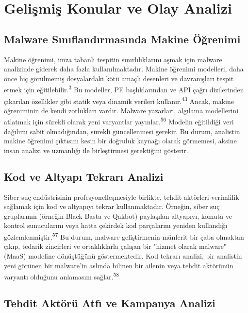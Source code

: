 \section{Gelişmiş Konular ve Olay Analizi}

\subsection{Malware Sınıflandırmasında Makine Öğrenimi}

Makine öğrenimi, imza tabanlı tespitin sınırlılıklarını aşmak için malware analizinde giderek daha fazla kullanılmaktadır. Makine öğrenimi modelleri, daha önce hiç görülmemiş dosyalardaki kötü amaçlı desenleri ve davranışları tespit etmek için eğitilebilir.\textsuperscript{3} Bu modeller, PE başlıklarından ve API çağrı dizilerinden çıkarılan özellikler gibi statik veya dinamik verileri kullanır.\textsuperscript{43} Ancak, makine öğreniminin de kendi zorlukları vardır. Malware yazarları, algılama modellerini atlatmak için sürekli olarak yeni varyantlar yayınlar.\textsuperscript{56} Modelin eğitildiği veri dağılımı sabit olmadığından, sürekli güncellenmesi gerekir. Bu durum, analistin makine öğrenimi çıktısını kesin bir doğruluk kaynağı olarak görmemesi, aksine insan analizi ve uzmanlığı ile birleştirmesi gerektiğini gösterir.

\subsection{Kod ve Altyapı Tekrarı Analizi}

Siber suç endüstrisinin profesyonelleşmesiyle birlikte, tehdit aktörleri verimlilik sağlamak için kod ve altyapıyı tekrar kullanmaktadır. Örneğin, siber suç gruplarının (örneğin Black Basta ve Qakbot) paylaşılan altyapıyı, komuta ve kontrol sunucularını veya hatta çekirdek kod parçalarını yeniden kullandığı gözlemlenmiştir.\textsuperscript{57} Bu durum, malware geliştirmenin münferit bir çaba olmaktan çıkıp, tedarik zincirleri ve ortaklıklarla çalışan bir "hizmet olarak malware" (MaaS) modeline dönüştüğünü göstermektedir. Kod tekrarı analizi, bir analistin yeni görünen bir malware'in aslında bilinen bir ailenin veya tehdit aktörünün varyantı olduğunu anlamasını sağlar.\textsuperscript{58}

\subsection{Tehdit Aktörü Atfı ve Kampanya Analizi}

